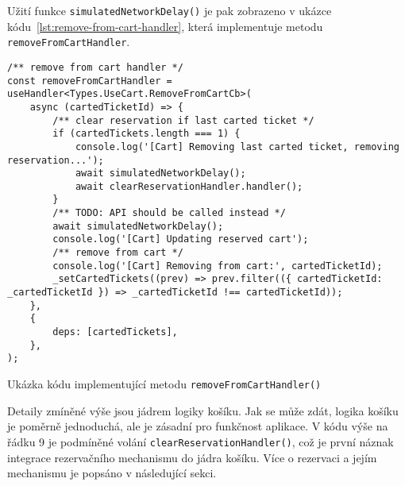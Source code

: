 Užití funkce \texttt{simulatedNetworkDelay()} je pak zobrazeno v ukázce kódu~\ref{lst:remove-from-cart-handler}, která implementuje metodu \texttt{removeFromCartHandler}.

\begin{listing}[!h]
\begin{verbatim}
/** remove from cart handler */
const removeFromCartHandler = useHandler<Types.UseCart.RemoveFromCartCb>(
	async (cartedTicketId) => {
		/** clear reservation if last carted ticket */
		if (cartedTickets.length === 1) {
			console.log('[Cart] Removing last carted ticket, removing reservation...');
			await simulatedNetworkDelay();
			await clearReservationHandler.handler();
		}
		/** TODO: API should be called instead */
		await simulatedNetworkDelay();
		console.log('[Cart] Updating reserved cart');
		/** remove from cart */
		console.log('[Cart] Removing from cart:', cartedTicketId);
		_setCartedTickets((prev) => prev.filter(({ cartedTicketId: _cartedTicketId }) => _cartedTicketId !== cartedTicketId));
	},
	{
		deps: [cartedTickets],
	},
);
\end{verbatim}
\caption{Ukázka kódu implementující metodu \texttt{removeFromCartHandler()}}
\label{lst:remove-from-cart-handler}
\end{listing}

Detaily zmíněné výše jsou jádrem logiky košíku.
Jak se může zdát, logika košíku je poměrně jednoduchá, ale je zásadní pro funkčnost aplikace.
V kódu výše na řádku 9 je podmíněné volání \texttt{clearReservationHandler()}, což je první náznak integrace rezervačního mechanismu do jádra košíku.
Více o rezervaci a jejím mechanismu je popsáno v následující sekci.
